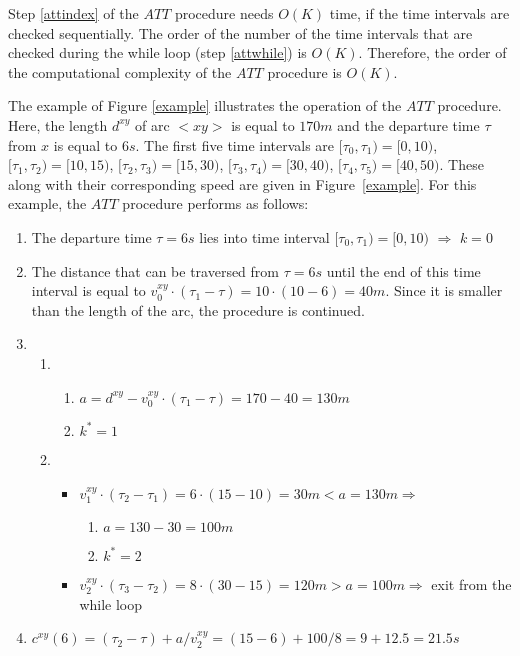 \documentclass[conference]{IEEEtran}
\begin{document}
Step \ref{attindex} of the $ATT$ procedure needs $O(K)$ time, if the time intervals are checked sequentially. The order of the number of the time intervals that are checked during the while loop (step \ref{attwhile}) is $O(K)$. Therefore, the order of the computational complexity of the $ATT$ procedure is $O(K)$. 

The example of Figure \ref{example} illustrates the operation of the $ATT$ procedure. Here, the length $d^{xy}$ of arc $<xy>$ is equal to $170m$ and the departure time $\tau$ from $x$ is equal to $6s$. The first five time intervals are $[\tau_0, \tau_1)=[0,10)$,  $[\tau_1, \tau_2)=[10,15)$,  $[\tau_2, \tau_3)=[15,30)$,  $[\tau_3, \tau_4)=[30,40)$, $[\tau_4, \tau_5)=[40,50)$. These along with their corresponding speed are given in Figure~\ref{example}. For this example, the $ATT$ procedure performs as follows:

\begin{enumerate}
    \item The departure time $\tau=6s$ lies into time interval $[\tau_0, \tau_1)=[0,10)$ $\Rightarrow$ $k=0$
    \item The distance that can be traversed from $\tau=6s$ until the end of this time interval is equal to $v_0^{xy}\cdot(\tau_1-\tau)=10\cdot(10-6)=40m$. Since it is smaller than the length of the arc, the procedure is continued.
    \item
    \begin{enumerate}
        \item 
        \begin{enumerate}
            \item $a=d^{xy}-v_{0}^{xy}\cdot(\tau_{1}-\tau)=170-40=130m$
            \item ${k^*}=1$
        \end{enumerate}       
        \item 
        \begin{itemize}
            \item $v_{1}^{xy}\cdot(\tau_{2}-\tau_{1})=6\cdot(15-10)=30m<a=130m \Rightarrow$
            \begin{enumerate}
                \item $a=130-30=100m$
                \item ${k^*}=2$ 
            \end{enumerate}
            \item $v_{2}^{xy}\cdot(\tau_{3}-\tau_{2})=8\cdot(30-15)=120m>a=100m \Rightarrow$ exit from the while loop
        \end{itemize}
    \end{enumerate}
    \item $c^{xy}(6)=(\tau_2-\tau)+a/v_2^{xy}=(15-6)+100/8=9+12.5=21.5s$
\end{enumerate}
\end{document}
